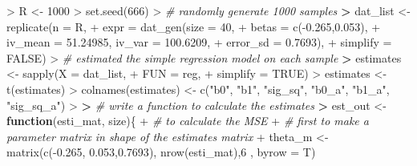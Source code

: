 \documentclass[
]{article}
\newenvironment{Shaded}{\begin{snugshade}}{\end{snugshade}}
\newcommand{\AttributeTok}[1]{\textcolor[rgb]{0.77,0.63,0.00}{#1}}
\newcommand{\CommentTok}[1]{\textcolor[rgb]{0.56,0.35,0.01}{\textit{#1}}}
\newcommand{\ConstantTok}[1]{\textcolor[rgb]{0.00,0.00,0.00}{#1}}
\newcommand{\ControlFlowTok}[1]{\textcolor[rgb]{0.13,0.29,0.53}{\textbf{#1}}}
\newcommand{\DecValTok}[1]{\textcolor[rgb]{0.00,0.00,0.81}{#1}}
\newcommand{\ErrorTok}[1]{\textcolor[rgb]{0.64,0.00,0.00}{\textbf{#1}}}
\newcommand{\FloatTok}[1]{\textcolor[rgb]{0.00,0.00,0.81}{#1}}
\newcommand{\FunctionTok}[1]{\textcolor[rgb]{0.00,0.00,0.00}{#1}}
\newcommand{\NormalTok}[1]{#1}
\newcommand{\OtherTok}[1]{\textcolor[rgb]{0.56,0.35,0.01}{#1}}
\newcommand{\SpecialCharTok}[1]{\textcolor[rgb]{0.00,0.00,0.00}{#1}}
\newcommand{\StringTok}[1]{\textcolor[rgb]{0.31,0.60,0.02}{#1}}
\begin{document}
\begin{Shaded}
\begin{Highlighting}[]
\SpecialCharTok{\textgreater{}}\NormalTok{ R }\OtherTok{\textless{}{-}} \DecValTok{1000}
\SpecialCharTok{\textgreater{}} \FunctionTok{set.seed}\NormalTok{(}\DecValTok{666}\NormalTok{)}
\SpecialCharTok{\textgreater{}} \CommentTok{\# randomly generate 1000 samples}
\ErrorTok{\textgreater{}}\NormalTok{ dat\_list }\OtherTok{\textless{}{-}} \FunctionTok{replicate}\NormalTok{(}\AttributeTok{n =}\NormalTok{ R,}
\SpecialCharTok{+}                       \AttributeTok{expr =} \FunctionTok{dat\_gen}\NormalTok{(}\AttributeTok{size =} \DecValTok{40}\NormalTok{,}
\SpecialCharTok{+}                                      \AttributeTok{betas =} \FunctionTok{c}\NormalTok{(}\SpecialCharTok{{-}}\FloatTok{0.265}\NormalTok{,}\FloatTok{0.053}\NormalTok{),}
\SpecialCharTok{+}                                      \AttributeTok{iv\_mean =} \FloatTok{51.24985}\NormalTok{, }\AttributeTok{iv\_var =} \FloatTok{100.6209}\NormalTok{,}
\SpecialCharTok{+}                                      \AttributeTok{error\_sd =} \FloatTok{0.7693}\NormalTok{),}
\SpecialCharTok{+}                       \AttributeTok{simplify =} \ConstantTok{FALSE}\NormalTok{)}
\SpecialCharTok{\textgreater{}} \CommentTok{\# estimated the simple regression model on each sample}
\ErrorTok{\textgreater{}}\NormalTok{ estimates }\OtherTok{\textless{}{-}} \FunctionTok{sapply}\NormalTok{(}\AttributeTok{X =}\NormalTok{ dat\_list,}
\SpecialCharTok{+}                     \AttributeTok{FUN =}\NormalTok{ reg,}
\SpecialCharTok{+}                     \AttributeTok{simplify =} \ConstantTok{TRUE}\NormalTok{)}
\SpecialCharTok{\textgreater{}}\NormalTok{ estimates }\OtherTok{\textless{}{-}} \FunctionTok{t}\NormalTok{(estimates)}
\SpecialCharTok{\textgreater{}} \FunctionTok{colnames}\NormalTok{(estimates) }\OtherTok{\textless{}{-}} \FunctionTok{c}\NormalTok{(}\StringTok{"b0"}\NormalTok{, }\StringTok{"b1"}\NormalTok{, }\StringTok{"sig\_sq"}\NormalTok{, }\StringTok{"b0\_a"}\NormalTok{, }\StringTok{"b1\_a"}\NormalTok{, }\StringTok{"sig\_sq\_a"}\NormalTok{)}
\SpecialCharTok{\textgreater{}} 
\ErrorTok{\textgreater{}} \CommentTok{\# write a function to calculate the estimates}
\ErrorTok{\textgreater{}}\NormalTok{ est\_out }\OtherTok{\textless{}{-}} \ControlFlowTok{function}\NormalTok{(esti\_mat, size)\{}
\SpecialCharTok{+}   \CommentTok{\# to calculate the MSE}
\SpecialCharTok{+}   \CommentTok{\# first to make a parameter matrix in shape of the estimates matrix}
\SpecialCharTok{+}\NormalTok{   theta\_m }\OtherTok{\textless{}{-}} \FunctionTok{matrix}\NormalTok{(}\FunctionTok{c}\NormalTok{(}\SpecialCharTok{{-}}\FloatTok{0.265}\NormalTok{, }\FloatTok{0.053}\NormalTok{,}\FloatTok{0.7693}\NormalTok{), }\FunctionTok{nrow}\NormalTok{(esti\_mat),}\DecValTok{6}\NormalTok{ , }\AttributeTok{byrow =}\NormalTok{ T)}

\end{Highlighting}
\end{Shaded}
\end{document}
